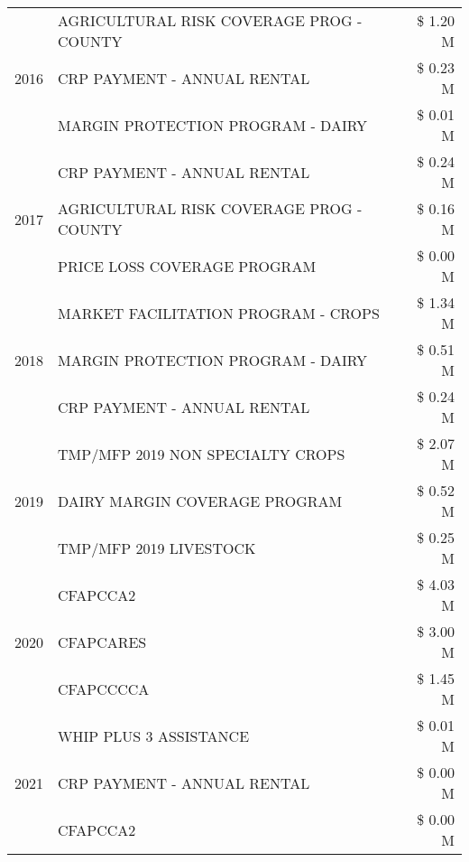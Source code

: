 \begin{tabular}{llr}
\multirow[t]{3}{*}{2016} & AGRICULTURAL RISK COVERAGE PROG - COUNTY & \$ 1.20 M \\
 & CRP PAYMENT - ANNUAL RENTAL & \$ 0.23 M \\
 & MARGIN PROTECTION PROGRAM - DAIRY & \$ 0.01 M \\
\cline{1-3}
\multirow[t]{3}{*}{2017} & CRP PAYMENT - ANNUAL RENTAL & \$ 0.24 M \\
 & AGRICULTURAL RISK COVERAGE PROG - COUNTY & \$ 0.16 M \\
 & PRICE LOSS COVERAGE PROGRAM & \$ 0.00 M \\
\cline{1-3}
\multirow[t]{3}{*}{2018} & MARKET FACILITATION PROGRAM - CROPS & \$ 1.34 M \\
 & MARGIN PROTECTION PROGRAM - DAIRY & \$ 0.51 M \\
 & CRP PAYMENT - ANNUAL RENTAL & \$ 0.24 M \\
\cline{1-3}
\multirow[t]{3}{*}{2019} & TMP/MFP 2019 NON SPECIALTY CROPS & \$ 2.07 M \\
 & DAIRY MARGIN COVERAGE PROGRAM & \$ 0.52 M \\
 & TMP/MFP 2019 LIVESTOCK & \$ 0.25 M \\
\cline{1-3}
\multirow[t]{3}{*}{2020} & CFAPCCA2 & \$ 4.03 M \\
 & CFAPCARES & \$ 3.00 M \\
 & CFAPCCCCA & \$ 1.45 M \\
\cline{1-3}
\multirow[t]{3}{*}{2021} & WHIP PLUS 3 ASSISTANCE & \$ 0.01 M \\
 & CRP PAYMENT - ANNUAL RENTAL & \$ 0.00 M \\
 & CFAPCCA2 & \$ 0.00 M \\
\cline{1-3}
\bottomrule
\end{tabular}
